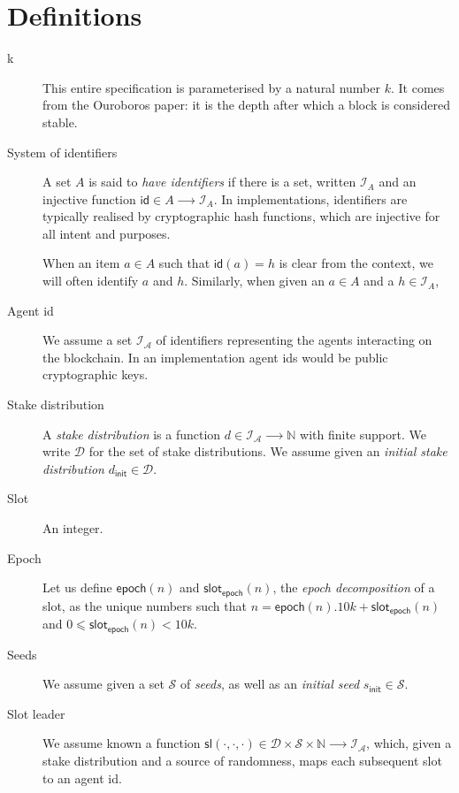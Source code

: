 \documentclass{article}
\newcommand{\idsof}[1]{\mathcal{I}\!_#1}
\newcommand{\id}{\mathsf{id}}
\newcommand{\agentids}{\idsof{\mathcal{A}}}
\newcommand{\slotleader}[3]{\mathsf{sl}(#1,#2,#3)}
\newcommand{\stakedistributions}{\mathcal{D}}
\newcommand{\seeds}{\mathcal{S}}
\newcommand{\initialdistribution}{d_{\mathsf{init}}}
\newcommand{\initialseed}{s_{\mathsf{init}}}
\newcommand{\epoch}[1]{\mathsf{epoch}(#1)}
\newcommand{\epochslot}[1]{\mathsf{slot}_\mathsf{epoch}(#1)}
\begin{document}
\section{Definitions}


\begin{description}
\item[k] This entire specification is parameterised by a natural
  number $k$. It comes from the Ouroboros paper: it is the depth after
  which a block is considered stable.

\item[System of identifiers] A set $A$ is said to \emph{have
    identifiers} if there is a set, written $\idsof{A}$ and an
  injective function $\id ∈ A ⟶ \idsof{A}$. In implementations,
  identifiers are typically realised by cryptographic hash functions,
  which are injective for all intent and purposes.

  When an item $a∈A$ such that $\id(a) = h$ is clear from the context,
  we will often identify $a$ and $h$. Similarly, when given an $a∈A$
  and a $h∈\idsof{A}$,

\item[Agent id] We assume a set $\agentids$ of identifiers
  representing the agents interacting on the blockchain. In an
  implementation agent ids would be public cryptographic keys.

\item[Stake distribution] A \emph{stake distribution} is a function
  $d ∈ \agentids ⟶ ℕ$ with finite support. We write
  $\stakedistributions$ for the set of stake distributions. We assume
  given an \emph{initial stake distribution}
  $\initialdistribution ∈ \stakedistributions$.

\item[Slot] An integer.

\item[Epoch] Let us define $\epoch{n}$ and $\epochslot{n}$, the
  \emph{epoch decomposition} of a slot, as the unique numbers such
  that $n=\epoch{n}.10k+\epochslot{n}$ and $0⩽ \epochslot{n} < 10k$.

\item[Seeds] We assume given a set $\seeds$ of \emph{seeds}, as well
  as an \emph{initial seed} $\initialseed ∈ \seeds$.

\item[Slot leader] We assume known a function
  $\slotleader{⋅}{⋅}{⋅} ∈ \stakedistributions×\seeds×ℕ ⟶ \agentids$,
  which, given a stake distribution and a source of randomness, maps
  each subsequent slot to an agent id.


\end{description}
\end{document}
